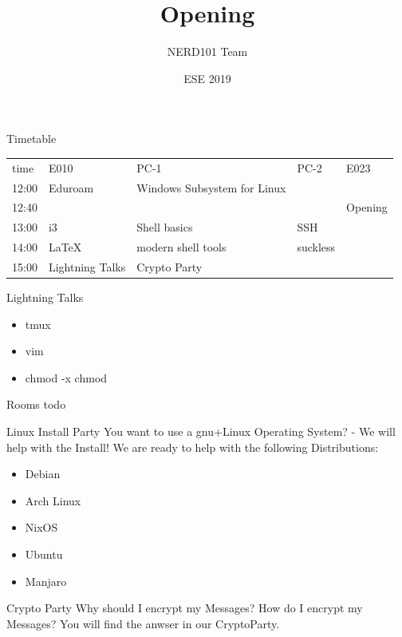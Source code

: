 \documentclass[10pt,graphics,aspectratio=169,table]{beamer}
\title{Opening}
\author{NERD101 Team}
\date{ESE 2019}
\institute{NERD101 - ESE - ifsr - TU Dresden}
\begin{document}
\maketitle

\begin{frame}{Timetable}
    \begin{tabular}{lllll}
        time  & E010            & PC-1                          & PC-2      & E023      \\
        12:00 & Eduroam         & Windows Subsystem for Linux   &           &           \\
        12:40 &                 &                               &           &Opening    \\
        13:00 & i3              & Shell basics                  & SSH       &           \\
        14:00 & \LaTeX          & modern shell tools            & suckless  &           \\
        15:00 & Lightning Talks & Crypto Party                  &           &           \\
    \end{tabular}
\end{frame}

\begin{frame}{Lightning Talks}
    \begin{itemize}
        \item tmux
        \item vim
        \item chmod -x chmod
    \end{itemize}
\end{frame}

\begin{frame}{Rooms}
    todo
\end{frame}

\begin{frame}{Linux Install Party}
    \alert{You want to use a gnu+Linux Operating System? - We will help with the Install!}
    We are ready to help with the following Distributions:
    \begin{itemize}
        \item Debian
        \item Arch Linux
        \item NixOS
        \item Ubuntu
        \item Manjaro
    \end{itemize}
\end{frame}

\begin{frame}{Crypto Party}
    \alert{Why should I encrypt my Messages?}
    \alert{How do I encrypt my Messages?}
    You will find the anwser in our CryptoParty.
\end{frame}
\end{document}
